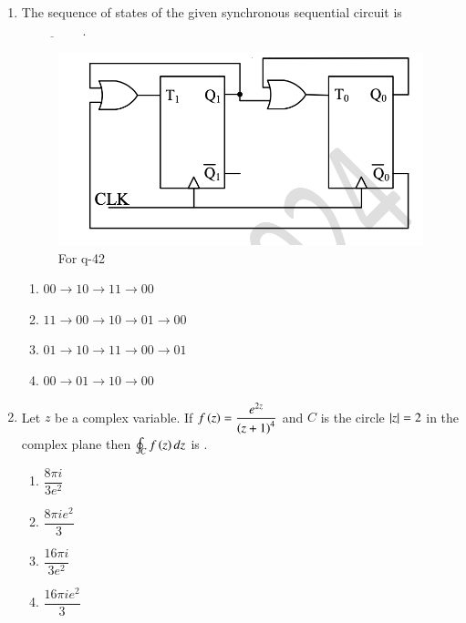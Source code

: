 \documentclass[journal,12pt,onecolumn]{IEEEtran}
\theoremstyle{remark}
\begin{document}
\begin{enumerate}
\item The sequence of states  of the given synchronous sequential circuit is $\underline{\hspace{2cm}}$.
\begin{figure}[H]
    \centering
    \includegraphics[width=0.6\columnwidth]{q42.png}
    \caption{For q-42}
    \label{fig:q42}
\end{figure}
\hfill{}
\begin{enumerate}
    \item $00 \rightarrow 10 \rightarrow 11 \rightarrow 00$
    \item $11 \rightarrow 00 \rightarrow 10 \rightarrow 01 \rightarrow 00$
    \item $01 \rightarrow 10 \rightarrow 11 \rightarrow 00 \rightarrow 01$
    \item $00 \rightarrow 01 \rightarrow 10 \rightarrow 00$
\end{enumerate}

\item Let $z$ be a complex variable. If $f\left(z\right) = \dfrac{e^{2z}}{\left(z+1\right)^4}$ and $C$ is the circle $\left\vert z\right\vert=2$ in the complex plane then $\oint_C f\left(z\right) dz$ is \underline{\hspace{2cm}}.
\hfill{}
\begin{multicols}{4}
    \begin{enumerate}
    \item $\dfrac{8\pi i}{3e^2}$
    \item $\dfrac{8\pi i e^2}{3}$
    \item $\dfrac{16\pi i}{3e^2}$
    \item $\dfrac{16\pi i e^2}{3}$
\end{enumerate}
\end{multicols}


\end{enumerate}
\end{document}
